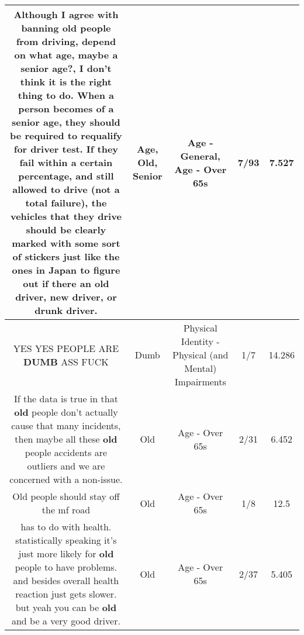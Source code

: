 \documentclass[11pt]{article}
\newlength\mylength
\begin{document}
\begin{center}
\begin{longtable}{|C{.65\mylength}|C{.30\mylength}|C{.12\mylength}|C{.12\mylength}|C{.12\mylength}|}
  \small Although I agree with banning \textbf{old} people from driving, depend on what \textbf{age}, maybe a \textbf{senior} \textbf{age}?, I don't think it is the right thing to do. When a person becomes of a \textbf{senior} \textbf{age}, they should be required to requalify for driver test. If they fail within a certain percentage, and still allowed to drive (not a total failure), the vehicles that they drive should be clearly marked with some sort of stickers just like the ones in Japan to figure out if there an \textbf{old} driver,  new driver,  or drunk driver.\normalsize   & Age, Old, Senior & Age - General, Age - Over 65s & 7/93 & 7.527 \\  \hline
  \small YES YES PEOPLE ARE \textbf{DUMB} ASS FUCK\normalsize   & Dumb & Physical Identity - Physical (and Mental) Impairments & 1/7 & 14.286 \\  \hline
  \small If the data is true in that \textbf{old} people don't actually cause that many incidents, then maybe all these \textbf{old} people accidents are outliers and we are concerned with a non-issue.\normalsize   & Old & Age - Over 65s & 2/31 & 6.452 \\  \hline
  \small Old people should stay off the mf road\normalsize   & Old & Age - Over 65s & 1/8 & 12.5 \\  \hline
  \small has to do with health. statistically speaking it's just more likely for \textbf{old} people to have problems.  and besides overall health reaction just gets slower. but yeah you can be \textbf{old} and be a very good driver.\normalsize   & Old & Age - Over 65s & 2/37 & 5.405 \\  \hline

\end{longtable}
\end{center}
\end{document}
